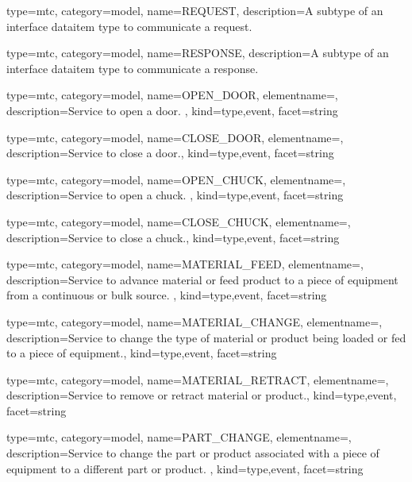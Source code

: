 {
  type=mtc,
  category=model,
  name={REQUEST},
  description={A subtype of an \gls{interface} \gls{dataitem} type to communicate a request. }
}


{
  type=mtc,
  category=model,
  name={RESPONSE},
  description={A subtype of an \gls{interface} \gls{dataitem} type to communicate a response.}
}


{
  type=mtc,
  category=model,
  name={OPEN\_DOOR},
  elementname=,
  description={Service to open a door. },
  kind={type,event},
  facet={\gls{string}}
}


{
  type=mtc,
  category=model,
  name={CLOSE\_DOOR},
  elementname=,
  description={Service to close a door.},
  kind={type,event},
  facet={\gls{string}}
}


{
  type=mtc,
  category=model,
  name={OPEN\_CHUCK},
  elementname=,
  description={Service to open a chuck. },
  kind={type,event},
  facet={\gls{string}}
}


{
  type=mtc,
  category=model,
  name={CLOSE\_CHUCK},
  elementname=,
  description={Service to close a chuck.},
  kind={type,event},
  facet={\gls{string}}
}


{
  type=mtc,
  category=model,
  name={MATERIAL\_FEED},
  elementname=,
  description={Service to advance material or feed product to a piece of equipment from a continuous or bulk source. },
  kind={type,event},
  facet={\gls{string}}
}


{
  type=mtc,
  category=model,
  name={MATERIAL\_CHANGE},
  elementname=,
  description={Service to change the type of material or product being loaded or fed to a piece of equipment.},
  kind={type,event},
  facet={\gls{string}}
}


{
  type=mtc,
  category=model,
  name={MATERIAL\_RETRACT},
  elementname=,
  description={Service to remove or retract material or product.},
  kind={type,event},
  facet={\gls{string}}
}


{
  type=mtc,
  category=model,
  name={PART\_CHANGE},
  elementname=,
  description={Service to change the part or product associated with a piece of equipment to a different part or product.  },
  kind={type,event},
  facet={\gls{string}}
}



